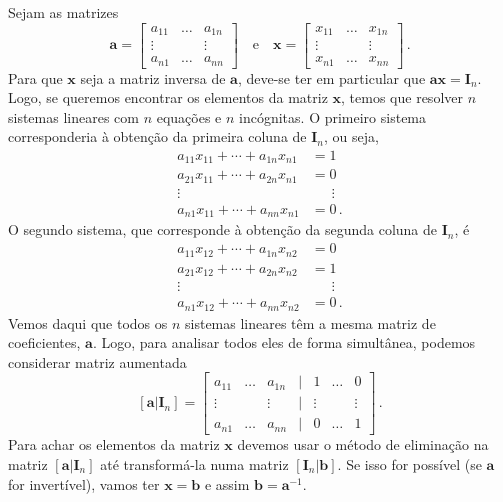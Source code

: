 \documentclass[12pt,a4paper]{report}
\newcommand{\mb}{\mathbf}
\begin{document}
Sejam as matrizes
$$\mb a=\begin{bmatrix}
  a_{11}&\ldots&a_{1n}\\
  \vdots&&\vdots\\
  a_{n1}&\ldots&a_{nn}
\end{bmatrix}\quad\text{e}\quad \mb x=\begin{bmatrix}
  x_{11}&\ldots&x_{1n}\\
  \vdots&&\vdots\\
  x_{n1}&\ldots&x_{nn}
\end{bmatrix}\,.$$
Para que $\mb x$ seja a matriz inversa de $\mb a$, deve-se ter em particular que $\mb a\mb x=\mb I_n$. Logo, se queremos encontrar os elementos da matriz $\mb x$, temos que resolver $n$ sistemas lineares com $n$ equações e $n$ incógnitas. O primeiro sistema corresponderia à obtenção da primeira coluna de $\mb I_n$, ou seja,
\begin{equation*}
  \begin{split}
    a_{11}x_{11}+\cdots+a_{1n}x_{n1}&=1\\
    a_{21}x_{11}+\cdots+a_{2n}x_{n1}&=0\\
    \vdots\qquad\qquad&\quad\,\,\,\vdots\\
    a_{n1}x_{11}+\cdots+a_{nn}x_{n1}&=0\,.
  \end{split}
\end{equation*}
O segundo sistema, que corresponde à obtenção da segunda coluna de $\mb I_n$, é
\begin{equation*}
  \begin{split}
    a_{11}x_{12}+\cdots+a_{1n}x_{n2}&=0\\
    a_{21}x_{12}+\cdots+a_{2n}x_{n2}&=1\\
    \vdots\qquad\qquad&\quad\,\,\,\vdots\\
    a_{n1}x_{12}+\cdots+a_{nn}x_{n2}&=0\,.
  \end{split}
\end{equation*}
Vemos daqui que todos os $n$ sistemas lineares têm a mesma matriz de coeficientes, $\mb a$. Logo, para analisar todos eles de forma simultânea, podemos considerar matriz aumentada
$$[\mb a|\mb I_n]=\begin{bmatrix}
  a_{11}&\ldots&a_{1n}&|&1&\ldots&0\\
  \vdots&&\vdots&|&\vdots&&\vdots\\
  a_{n1}&\ldots&a_{nn}&|&0&\ldots&1
\end{bmatrix}\,.$$
Para achar os elementos da matriz $\mb x$ devemos usar o método de eliminação na matriz $[\mb a|\mb I_n]$ até transformá-la numa matriz $[\mb I_n|\mb b]$. Se isso for possível (se $\mb a$ for invertível), vamos ter $\mb x=\mb b$ e assim $\mb b=\mb a^{-1}$.
\end{document}

